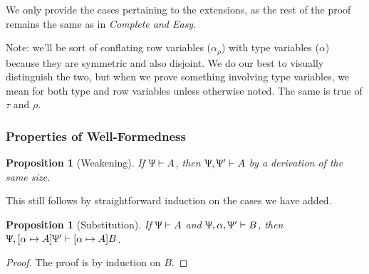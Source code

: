 \documentclass{article}
\newtheorem{prop}[thm]{Proposition}
\newcommand{\declCtx}{\Uppsi}
\newcommand{\rcd}[1]{\{#1\}}
\newcommand{\rowall}{\rotatebox[origin=c]{180}{\(\mathsf{R}\)}}
\newcommand{\rowvar}{\alpha_\rho}
\newcommand{\wf}[2]{#1 \vdash #2}
\begin{document}
We only provide the cases pertaining to the extensions, as the rest of the proof
remains the same as in \textit{Complete and Easy}.

Note: we'll be sort of conflating row variables (\(\rowvar\)) with type
variables (\(\alpha\)) because they are symmetric and also disjoint. We do our
best to visually distinguish the two, but when we prove something involving type
variables, we mean for both type and row variables unless otherwise noted. The
same is true of \(\tau\) and \(\rho\).

\subsubsection{Properties of Well-Formedness}
\begin{prop}[Weakening]
  If \(\wf \declCtx A\), then \(\wf {\declCtx, \declCtx'} A\) by a derivation of
  the same size.
\end{prop}

This still follows by straightforward induction on the cases we have added.

\begin{prop}[Substitution]
  If \(\wf \declCtx A\) and \(\wf {\declCtx, \alpha, \declCtx'} B\), then \(\wf
  {\declCtx, [\alpha \mapsto A] \declCtx'} {[\alpha \mapsto A] B}\).
\end{prop}

\begin{proof}
The proof is by induction on \(B\).
\end{proof}
\end{document}

